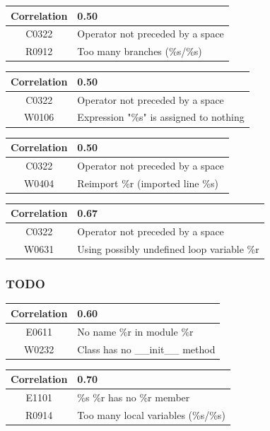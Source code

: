\documentclass[12pt, a4paper]{article}
\newcommand{\tbf}[1]{\textbf{#1}}
\newcommand{\noi}{\noindent}
\begin{document}
\bigskip \noi
\begin{tabularx}{\textwidth}{|c|X|}
\hline
\tbf{Correlation}		& 0.50 \\
\hline
C0322		& Operator not preceded by a space \\
\hline
R0912		& Too many branches (\%s/\%s) \\
\hline
\end{tabularx}


\bigskip \noi
\begin{tabularx}{\textwidth}{|c|X|}
\hline
\tbf{Correlation}		& 0.50 \\
\hline
C0322		& Operator not preceded by a space \\
\hline
W0106		& Expression "\%s" is assigned to nothing \\
\hline
\end{tabularx}


\bigskip \noi
\begin{tabularx}{\textwidth}{|c|X|}
\hline
\tbf{Correlation}		& 0.50 \\
\hline
C0322		& Operator not preceded by a space \\
\hline
W0404		& Reimport \%r (imported line \%s) \\
\hline
\end{tabularx}


\bigskip \noi
\begin{tabularx}{\textwidth}{|c|X|}
\hline
\tbf{Correlation}		& 0.67 \\
\hline
C0322		& Operator not preceded by a space \\
\hline
W0631		& Using possibly undefined loop variable \%r \\
\hline
\end{tabularx}




\subsubsection*{TODO}

\bigskip \noi
\begin{tabularx}{\textwidth}{|c|X|}
\hline
\tbf{Correlation}		& 0.60 \\
\hline
E0611		& No name \%r in module \%r \\
\hline
W0232		& Class has no \_\_init\_\_ method \\
\hline
\end{tabularx}


\bigskip \noi
\begin{tabularx}{\textwidth}{|c|X|}
\hline
\tbf{Correlation}		& 0.70 \\
\hline
E1101		& \%s \%r has no \%r member \\
\hline
R0914		& Too many local variables (\%s/\%s) \\
\hline
\end{tabularx}
\end{document}
